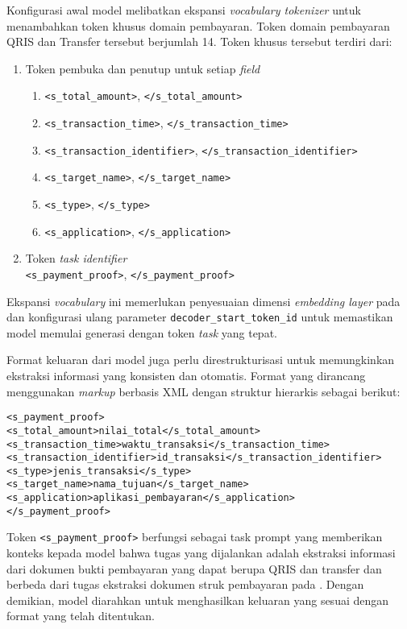 Konfigurasi awal model melibatkan ekspansi \emph{vocabulary tokenizer} untuk menambahkan token khusus domain pembayaran. Token domain pembayaran QRIS dan Transfer tersebut berjumlah 14. Token khusus tersebut terdiri dari:
\begin{enumerate}
    \item Token pembuka dan penutup untuk setiap \emph{field}
    \begin{enumerate}
        \item \texttt{<s\_total\_amount>}, \texttt{</s\_total\_amount>}
        \item \texttt{<s\_transaction\_time>}, \texttt{</s\_transaction\_time>}
        \item \texttt{<s\_transaction\_identifier>}, \texttt{</s\_transaction\_identifier>}
        \item \texttt{<s\_target\_name>}, \texttt{</s\_target\_name>}
        \item \texttt{<s\_type>}, \texttt{</s\_type>}
        \item \texttt{<s\_application>}, \texttt{</s\_application>}
    \end{enumerate}
    \item Token \emph{task identifier}~\\ \texttt{<s\_payment\_proof>}, \texttt{</s\_payment\_proof>}
\end{enumerate}

Ekspansi \emph{vocabulary} ini memerlukan penyesuaian dimensi \emph{embedding layer} pada \decoder{} dan konfigurasi ulang parameter \texttt{decoder\_start\_token\_id} untuk memastikan model memulai generasi dengan token \emph{task} yang tepat.

Format keluaran dari model juga perlu direstrukturisasi untuk memungkinkan ekstraksi informasi yang konsisten dan otomatis. Format yang dirancang menggunakan \emph{markup} berbasis XML dengan struktur hierarkis sebagai berikut:

\begin{verbatim}
<s_payment_proof>
<s_total_amount>nilai_total</s_total_amount>
<s_transaction_time>waktu_transaksi</s_transaction_time>
<s_transaction_identifier>id_transaksi</s_transaction_identifier>
<s_type>jenis_transaksi</s_type>
<s_target_name>nama_tujuan</s_target_name>
<s_application>aplikasi_pembayaran</s_application>
</s_payment_proof>
\end{verbatim}

Token \texttt{<s\_payment\_proof>} berfungsi sebagai task prompt yang memberikan konteks kepada model bahwa tugas yang dijalankan adalah ekstraksi informasi dari dokumen bukti pembayaran yang dapat berupa QRIS dan transfer dan berbeda dari tugas ekstraksi dokumen struk pembayaran pada \donutcord. Dengan demikian, model diarahkan untuk menghasilkan keluaran yang sesuai dengan format yang telah ditentukan.

